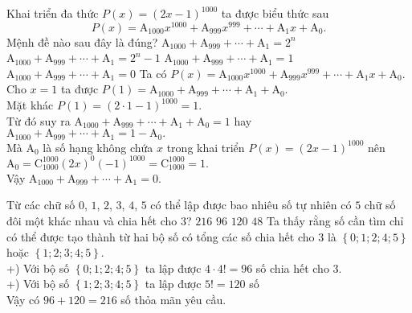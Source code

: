 \begin{ex}%
	Khai triển đa thức $P(x)={\left(2x-1\right)}^{1000}$ ta được biểu thức sau
	$$P(x)=\mathrm{A}_{1000}x^{1000}+\mathrm{A}_{999}x^{999}+\cdots+\mathrm{A}_1x+\mathrm{A}_0.$$
	Mệnh đề nào sau đây là đúng?
	\choice
	{$\mathrm{A}_{1000}+\mathrm{A}_{999}+\cdots+\mathrm{A}_1=2^n$}
	{$\mathrm{A}_{1000}+\mathrm{A}_{999}+\cdots+\mathrm{A}_1=2^n-1$}
	{$\mathrm{A}_{1000}+\mathrm{A}_{999}+\cdots+\mathrm{A}_1=1$}
	{\True $\mathrm{A}_{1000}+\mathrm{A}_{999}+\cdots+\mathrm{A}_1=0$}
	\loigiai
	{
		Ta có $P(x)=\mathrm{A}_{1000}x^{1000}+\mathrm{A}_{999}x^{999}+\cdots+\mathrm{A}_1x+\mathrm{A}_0$.\\
		Cho $x=1$ ta được $P(1)=\mathrm{A}_{1000}+\mathrm{A}_{999}+\cdots+\mathrm{A}_1+\mathrm{A}_0.$\\
		Mặt khác $P(1)={\left(2\cdot 1-1\right)}^{1000}=1$.\\
		Từ đó suy ra $\mathrm{A}_{1000}+\mathrm{A}_{999}+\cdots+\mathrm{A}_1+\mathrm{A}_0=1$ hay $\mathrm{A}_{1000}+\mathrm{A}_{999}+\cdots+\mathrm{A}_1=1-\mathrm{A}_0.$\\
		Mà $\mathrm{A}_0$ là số hạng không chứa $x$ trong khai triển $P(x)={\left(2x-1\right)}^{1000}$ nên\\
		$\mathrm{A}_0=\mathrm{C}_{1000}^{1000}{\left(2x\right)}^0{\left(-1\right)}^{1000}=\mathrm{C}_{1000}^{1000}=1.$\\
		Vậy $\mathrm{A}_{1000}+\mathrm{A}_{999}+\cdots+\mathrm{A}_1=0.$
	}
\end{ex}

\begin{ex}%
	Từ các chữ số $0$, $1$, $2$, $3$, $4$, $5$ có thể lập được bao nhiêu số tự nhiên có $5$ chữ số đôi một khác nhau và chia hết cho $3$?
	\choice
	{\True $216 $}
	{$96$}
	{$120$}
	{$48$}
	\loigiai
	{
		Ta thấy rằng số cần tìm chỉ có thể được tạo thành từ hai bộ số có tổng các số chia hết cho $3$ là $\left\{0;1;2;4;5  \right\} $  hoặc $\left\{ 1;2;3;4;5 \right\}$.\\
		+) Với bộ số $\left\{0;1;2;4;5  \right\} $ ta lập được $4 \cdot 4! = 96$ số chia hết cho $3$.\\
		+) Với bộ số $\left\{ 1;2;3;4;5 \right\}$ ta lập được $5! = 120$ số\\
		Vậy có $96+120=216$  số thỏa mãn yêu cầu.
	}
\end{ex}

